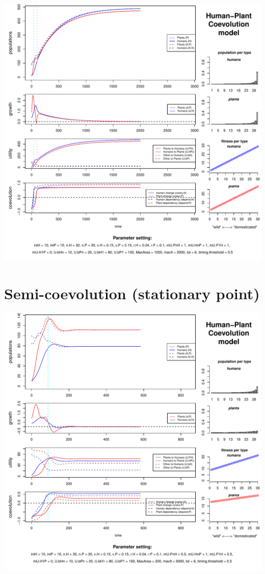\documentclass[]{book}
\begin{document}
\includegraphics{hpcModel-exploration_files/figure-latex/1_run.coevo.long.boom-plot-1.pdf}

\newpage

\hypertarget{semi-coevolution-stationary-point}{%
\section{Semi-coevolution (stationary point)}\label{semi-coevolution-stationary-point}}

\includegraphics{hpcModel-exploration_files/figure-latex/1_run.semicoevo-plot-1.pdf}
\end{document}
